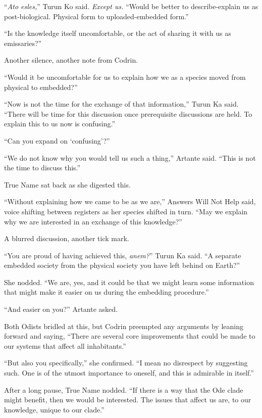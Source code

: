 ``\emph{Ato esles,}'' Turun Ko said. \emph{Except us.} ``Would be better to describe-explain us as post-biological. Physical form to uploaded-embedded form.''

``Is the knowledge itself uncomfortable, or the act of sharing it with us as emissaries?''

Another silence, another note from Codrin.

``Would it be uncomfortable for us to explain how we as a species moved from physical to embedded?''

``Now is not the time for the exchange of that information,'' Turun Ka said. ``There will be time for this discussion once prerequisite discussions are held. To explain this to us now is confusing.''

``Can you expand on `confusing'?''

``We do not know why you would tell us such a thing,'' Artante said. ``This is not the time to discuss this.''

True Name sat back as she digested this.

``Without explaining how we came to be as we are,'' Answers Will Not Help said, voice shifting between registers as her species shifted in turn. ``May we explain why we are interested in an exchange of this knowledge?''

A blurred discussion, another tick mark.

``You are proud of having achieved this, \emph{anem?}'' Turun Ka said. ``A separate embedded society from the physical society you have left behind on Earth?''

She nodded. ``We are, yes, and it could be that we might learn some information that might make it easier on us during the embedding procedure.''

``And easier on you?'' Artante asked.

Both Odists bridled at this, but Codrin preempted any arguments by leaning forward and saying, ``There are several core improvements that could be made to our systems that affect all inhabitants.''

``But also you specifically,'' she confirmed. ``I mean no disrespect by suggesting such. One is of the utmost importance to oneself, and this is admirable in itself.''

After a long pause, True Name nodded. ``If there is a way that the Ode clade might benefit, then we would be interested. The issues that affect us are, to our knowledge, unique to our clade.''

